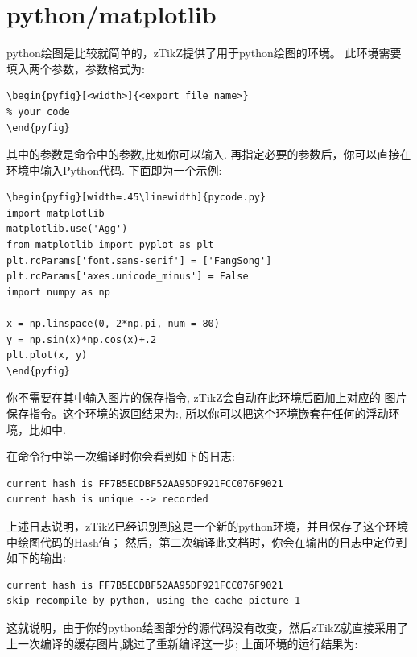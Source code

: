 \section{python/matplotlib}
python绘图是比较就简单的，zTikZ提供了用于python绘图的环境。
此环境需要填入两个参数，参数格式为:

\begin{verbatim}
\begin{pyfig}[<width>]{<export file name>}
% your code
\end{pyfig}
\end{verbatim}

其中的参数是命令\cmd{\texttt{[image: ]}}中的参数,比如你可以输入. 
再指定必要的参数后，你可以直接在环境中输入Python代码. 下面即为一个示例:

\begin{verbatim}
\begin{pyfig}[width=.45\linewidth]{pycode.py}
import matplotlib 
matplotlib.use('Agg')
from matplotlib import pyplot as plt
plt.rcParams['font.sans-serif'] = ['FangSong']  
plt.rcParams['axes.unicode_minus'] = False
import numpy as np

x = np.linspace(0, 2*np.pi, num = 80)
y = np.sin(x)*np.cos(x)+.2
plt.plot(x, y)
\end{pyfig}
\end{verbatim}

你不需要在其中输入图片的保存指令, zTikZ会自动在此环境后面加上对应的
图片保存指令。这个环境的返回结果为:,
所以你可以把这个环境嵌套在任何的浮动环境，比如中. 

在命令行中第一次编译时你会看到如下的日志:
\begin{verbatim}
current hash is FF7B5ECDBF52AA95DF921FCC076F9021
current hash is unique --> recorded
\end{verbatim}

上述日志说明，zTikZ已经识别到这是一个新的python环境，并且保存了这个环境中绘图代码的Hash值；
然后，第二次编译此文档时，你会在输出的日志中定位到如下的输出:
\begin{verbatim}
current hash is FF7B5ECDBF52AA95DF921FCC076F9021
skip recompile by python, using the cache picture 1
\end{verbatim}

这就说明，由于你的python绘图部分的源代码没有改变，然后zTikZ就直接采用了上一次编译的缓存图片,跳过了重新编译这一步;
上面环境的运行结果为:


